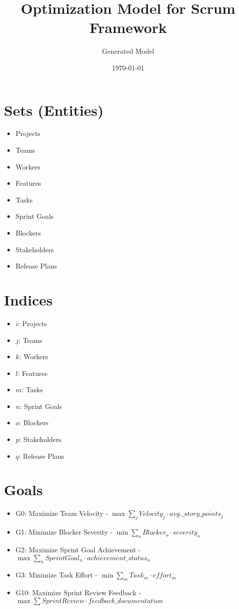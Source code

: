 \documentclass{article}
\title{Optimization Model for Scrum Framework}
\author{Generated Model}
\date{\today}
\begin{document}
\maketitle
\tableofcontents

\section{Sets (Entities)}
\begin{itemize}
    \item Projects
    \item Teams
    \item Workers
    \item Features
    \item Tasks
    \item Sprint Goals
    \item Blockers
    \item Stakeholders
    \item Release Plans
\end{itemize}

\section{Indices}
\begin{itemize}
    \item $i$: Projects
    \item $j$: Teams
    \item $k$: Workers
    \item $l$: Features
    \item $m$: Tasks
    \item $n$: Sprint Goals
    \item $o$: Blockers
    \item $p$: Stakeholders
    \item $q$: Release Plans
\end{itemize}

\section{Goals}
\begin{itemize}
    \item G0: Maximize Team Velocity - $\max \sum_{j} Velocity_{j} \cdot avg.\_story\_points_{j}$
    \item G1: Minimize Blocker Severity - $\min \sum_{o} Blocker_{o} \cdot severity_{o}$
    \item G2: Maximize Sprint Goal Achievement - $\max \sum_{n} SprintGoal_{n} \cdot achievement\_status_{n}$
    \item G3: Minimize Task Effort - $\min \sum_{m} Task_{m} \cdot effort_{m}$
    \item G10: Maximize Sprint Review Feedback - $\max \sum SprintReview \cdot feedback\_documentation$
\end{itemize}
\end{document}
